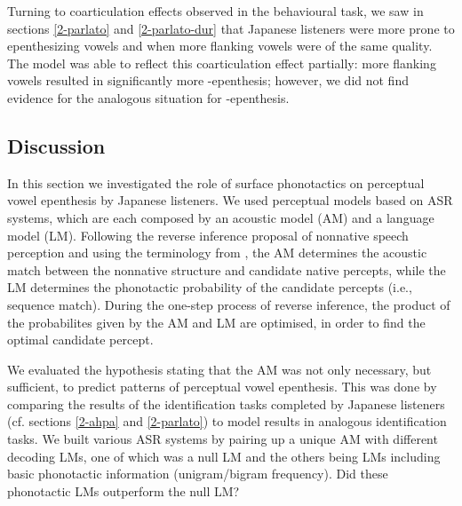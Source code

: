 {Turning to coarticulation effects observed in the behavioural task, we saw in sections \ref{2-parlato} and \ref{2-parlato-dur} that Japanese listeners were more prone to epenthesizing vowels  and  when more flanking vowels were of the same quality. The model was able to reflect this coarticulation effect partially: more  flanking vowels resulted in significantly more -epenthesis; however, we did not find evidence for the analogous situation for -epenthesis.  

\subsection{Discussion}
In this section we investigated the role of surface phonotactics on perceptual vowel epenthesis by Japanese listeners. We used perceptual models based on ASR systems, which are each composed by an acoustic model (AM) and a language model (LM). Following the reverse inference proposal of nonnative speech perception \cite{wilson2013} and using the terminology from \cite{dupoux2011}, the AM determines the acoustic match between the nonnative structure and candidate native percepts, while the LM determines the phonotactic probability of the candidate percepts (i.e., sequence match). During the one-step process of reverse inference, the product of the probabilites given by the AM and LM are optimised, in order to find the optimal candidate percept.

We evaluated the hypothesis stating that the AM was not only necessary, but sufficient, to predict patterns of perceptual vowel epenthesis. 
This was done by comparing the results of the identification tasks completed by Japanese listeners (cf. sections \ref{2-ahpa} and \ref{2-parlato}) to model results in analogous identification tasks. We built various ASR systems by pairing up a unique AM with different decoding LMs, one of which was a null LM and the others being LMs including basic phonotactic information (unigram/bigram frequency). Did these phonotactic LMs outperform the null LM?

}

